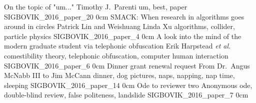 \addpaper
	{On the topic of "um..."}
	{Timothy J.\ Parenti}
	{um, best, paper}
	{SIGBOVIK_2016_paper_20}
	{0cm}
	{}
\addpaper
	{SMACK: When research in algorithms goes around in circles}
	{Patrick Lin and Weishuang Linda Xu}
	{algorithms, collider, particle physics}
	{SIGBOVIK_2016_paper_4}
	{0cm}
	{}
\addpaper
	{A look into the mind of the modern graduate student via telephonic obfuscation}
	{Erik Harpstead \textit{et al.}}
	{comestibility theory, telephonic obfuscation, computer human interaction}
	{SIGBOVIK_2016_paper_6}
	{0cm}
	{}
\addpaper
	{Dinner grant renewal request}
	{From Dr.\ Angus McNabb III to Jim McCann}
	{dinner, dog pictures, naps, napping, nap time, sleeping}
	{SIGBOVIK_2016_paper_14}
	{0cm}
	{}
\addpaper
	{Ode to reviewer two}
	{Anonymous}
	{ode, double-blind review, false politeness, landslide}
	{SIGBOVIK_2016_paper_7}
	{0cm}
	{}
